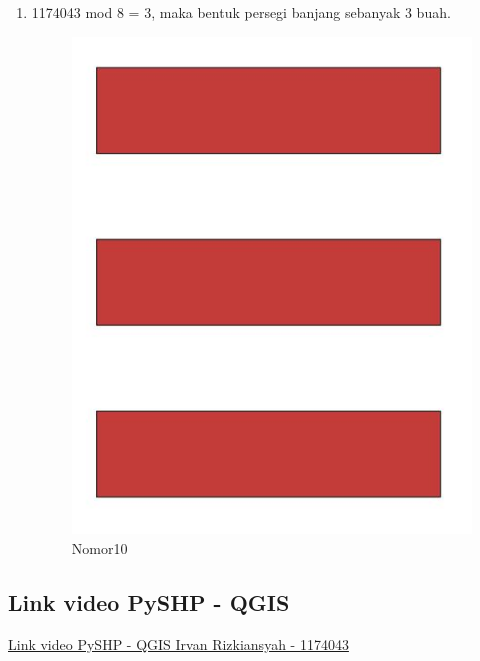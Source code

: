 \begin{enumerate}
			\item 1174043 mod 8 = 3, maka bentuk persegi banjang sebanyak 3 buah.
				
				\begin{figure}[H]
					\includegraphics[width=12cm]{figures/1174043/10.jpg}
					\centering
					\caption{Nomor10}
				\end{figure}	
		\end{enumerate}
		
	\subsection{Link video PySHP - QGIS}
		\href{https://youtu.be/ojRLi8rJ4B8} {Link video PySHP - QGIS Irvan Rizkiansyah - 1174043}